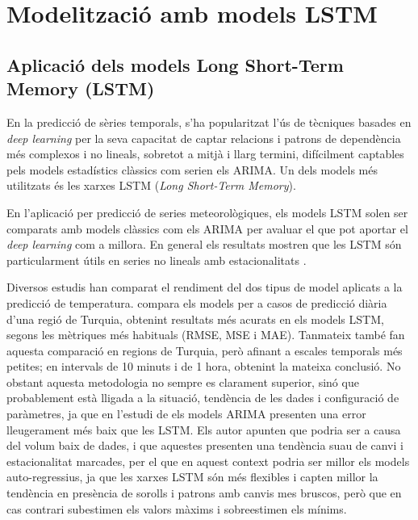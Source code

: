 \documentclass[../main.tex]{subfiles}
\begin{document}

\chapter{Modelització amb models LSTM} \label{ch:Models LSTM}

 
\section{Aplicació dels models Long Short-Term Memory (LSTM)}


En la predicció de sèries temporals, s'ha popularitzat l'ús de tècniques basades en \textit{deep learning} per la seva capacitat de captar relacions i patrons de dependència més complexos i no lineals, sobretot a mitjà i llarg termini, difícilment captables pels models estadístics clàssics com serien els ARIMA. Un dels models més utilitzats és les xarxes LSTM (\textit{Long Short-Term Memory}).

En l'aplicació per predicció de series meteorològiques, els models LSTM solen ser comparats amb models clàssics com els ARIMA per avaluar el que pot aportar el \textit{deep learning} com a millora. En general els resultats mostren que les LSTM són particularment útils en series no lineals amb estacionalitats \parencite{lim2021time, de2020comparison}.

Diversos estudis han comparat el rendiment del dos tipus de model aplicats a la predicció de temperatura. \cite{tugal2023analysis} compara els models per a casos de predicció diària d'una regió de Turquia, obtenint resultats més acurats en els models LSTM, segons les mètriques més habituals (RMSE, MSE i MAE). Tanmateix \cite{ozbek2021prediction} també fan aquesta comparació en regions de Turquia, però afinant a escales temporals més petites; en intervals de 10 minuts i de 1 hora, obtenint la mateixa conclusió. No obstant aquesta metodologia no sempre es clarament superior, sinó que probablement està lligada a la situació, tendència de les dades i configuració de paràmetres, ja que en l'estudi de \cite{koccak2023time} els models ARIMA presenten una error lleugerament més baix que les LSTM. Els autor apunten que podria ser a causa del volum baix de dades, i que aquestes presenten una tendència suau de canvi i estacionalitat marcades, per el que en aquest context podria ser millor els models auto-regressius, ja que les xarxes LSTM són més flexibles i capten millor la tendència en presència de sorolls i patrons amb canvis mes bruscos, però que en cas contrari subestimen els valors màxims i sobreestimen els mínims.
\end{document}
